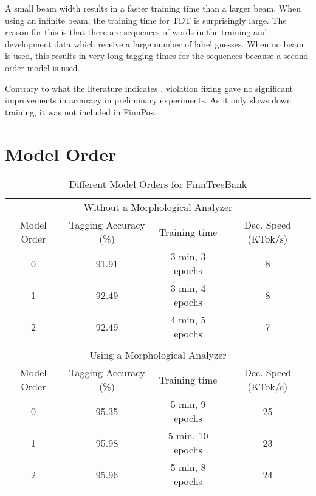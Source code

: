 A small beam width results in a faster training time than a larger
beam. When using an infinite beam, the training time for TDT is
surprisingly large. The reason for this is that there are sequences of
words in the training and development data which receive a large
number of label guesses. When no beam is used, this results in very
long tagging times for the sequences because a second order model is
used.

Contrary to what the literature indicates
\citep{Huang2012,Collins2004}, violation fixing gave no significant
improvements in accuracy in preliminary experiments. As it only slows
down training, it was not included in FinnPos.

\section{Model Order}

\begin{table}[htb!]
\begin{center}
\begin{tabular}{cccc}
\multicolumn{4}{c}{Without a Morphological Analyzer}\\
Model Order & Tagging Accuracy (\%) & Training time & Dec. Speed (KTok/s)\\
\hline
0        & 91.91            & 3 min, 3 epochs            & 8            \\
1        & 92.49            & 3 min, 4 epochs            & 8            \\
2        & 92.49            & 4 min, 5 epochs            & 7            \\
                &                       &                  &            \\
\multicolumn{4}{c}{Using a Morphological Analyzer}\\
Model Order & Tagging Accuracy (\%) & Training time & Dec. Speed (KTok/s)\\
\hline
0        & 95.35            & 5 min, 9 epochs            & 25            \\
1        & 95.98            & 5 min, 10 epochs           & 23            \\
2        & 95.96            & 5 min, 8 epochs            & 24            \\
\end{tabular}
\caption{Different Model Orders for FinnTreeBank}
\end{center}
\end{table}

